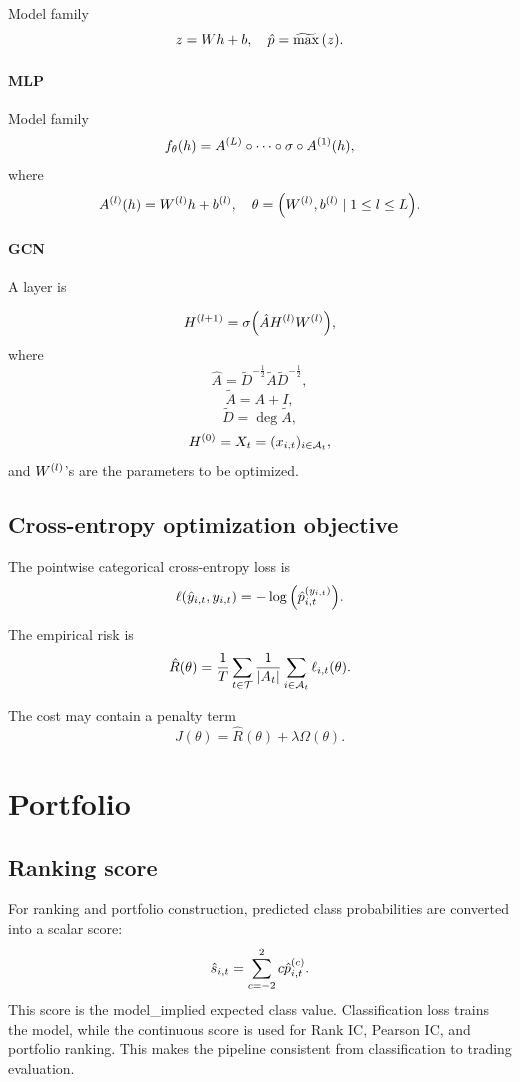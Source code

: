 \documentclass[11pt]{article}
\begin{document}
Model family \[z = Wh+b,\quad \hat p = \operatorname{\widetilde{\max}}{\left\lparen z\right\rparen}.\]

\paragraph{MLP}

Model family \[f_\theta (h) =  A^{\left\lparen L\right\rparen} \circ \cdots \circ \sigma \circ A^{\left\lparen1\right\rparen}(h),\] where \[A^{\left\lparen l\right\rparen}{\left\lparen h\right\rparen} = W^{\left\lparen l\right\rparen}h +b ^{\left\lparen l\right\rparen},\quad \theta = {\left\lparen W^{\left\lparen l\right\rparen},b^{\left\lparen l\right\rparen}\mid 1\le l\le L\right\rparen}.\]

 

\paragraph{GCN}

A layer is 

\[H^{\left\lparen l +1\right\rparen} = \sigma{\left\lparen\hat AH^{\left\lparen l\right\rparen}W^{\left\lparen l\right\rparen}\right\rparen},\] where \[\hat A = \tilde{ D}^{-\frac12}\tilde A \tilde D^{-\frac12},\] 
\[\tilde A = A + I,\] \[\tilde D =\deg \tilde A ,\] \[H^{\left\lparen0\right\rparen} = X_t = (x_{i,t})_{i\in \mathcal A_t},\]  and \(W^{\left\lparen l\right\rparen}\)'s are the parameters to be optimized.

\subsection{Cross-entropy optimization objective}
The pointwise categorical cross-entropy loss is \[\ell (\hat y_{i,t},y_{i,t}) = -\log {\left\lparen \hat p_{i,t}^{\left\lparen y_{i,t}\right\rparen}\right\rparen}.\]

The empirical risk is \[\hat R (\theta)= \frac{1}{T} \sum_{t\in \mathcal T}\frac{1}{|A_t|} \sum_{i\in \mathcal A_t}\ell_{i,t}{\left\lparen\theta\right\rparen}.\]

The cost may contain a penalty term \[J(\theta) = \hat R(\theta) + \lambda \Omega(\theta).\]

\section{Portfolio}

\subsection{Ranking score}

For ranking and portfolio construction, predicted class probabilities are converted into a scalar score:
\[
    \hat{s}_{i,t}
    =
    \sum_{c=-2}^{2} c\hat p_{i,t}^{\left\lparen c\right\rparen}.
\]
This score is the model\_implied expected class value. Classification loss trains the model, while the continuous score is used for Rank IC, Pearson IC, and portfolio ranking. This makes the pipeline consistent from classification to trading evaluation.
\end{document}
